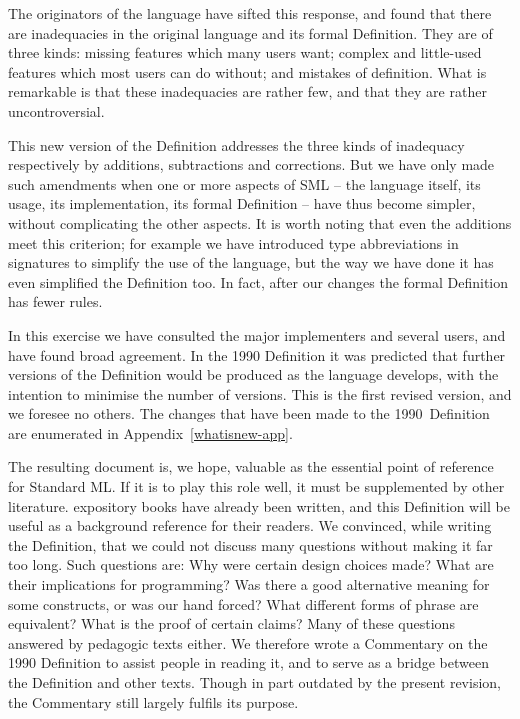 The originators of the language have sifted this response, and
found that there are inadequacies in the original language and its 
formal Definition.  They are of three kinds: missing features which
many users want;  complex and little-used features which most
users can do without; and mistakes of definition.  What is
remarkable is that these inadequacies are rather few, and that they
are rather uncontroversial.  

This new version of the Definition addresses the three kinds
of inadequacy respectively by additions, subtractions and corrections.
But we have only made such amendments when one or more aspects of
SML -- the language itself, its usage, its implementation, its formal 
Definition -- have thus become simpler, without complicating the
other aspects.  It is worth noting that even the additions meet this 
criterion; for example we have introduced type abbreviations
in signatures to simplify the use of the language, but the way we
have done it has even simplified the Definition too.   In fact,
after our changes the formal Definition has fewer rules.

In this exercise we have consulted the major implementers and several
users, and have found broad agreement.  In the 1990 Definition it was
predicted that further versions of the Definition would be produced as
the language develops, with the intention to minimise the number of
versions.  This is the first revised version, and we foresee no
others. The changes that have been made to the 1990~Definition are
enumerated in Appendix~\ref{whatisnew-app}.

The resulting document is, we hope, valuable as the essential point of 
reference for Standard ML.  If it is to play this role well, it must
be supplemented by other literature.  
expository books have already been 
written, and this Definition will be useful as a 
background reference for their readers. 
We 
convinced, while
writing the  Definition, that we could 
not discuss many questions without 
making it far too long.  Such questions are: Why were certain design choices
made?  What are their implications for programming?  
Was there a good alternative meaning for some constructs, or was our
hand forced?  What different forms of phrase are equivalent? What is the proof
of certain claims?  Many of these
questions  
answered by pedagogic texts either. 
{We therefore wrote a 
Commentary on the 1990
Definition to
assist people in reading it, and to
serve as a bridge between the Definition and other texts. Though in
part outdated by the present revision, the Commentary still largely fulfils its 
purpose.}

